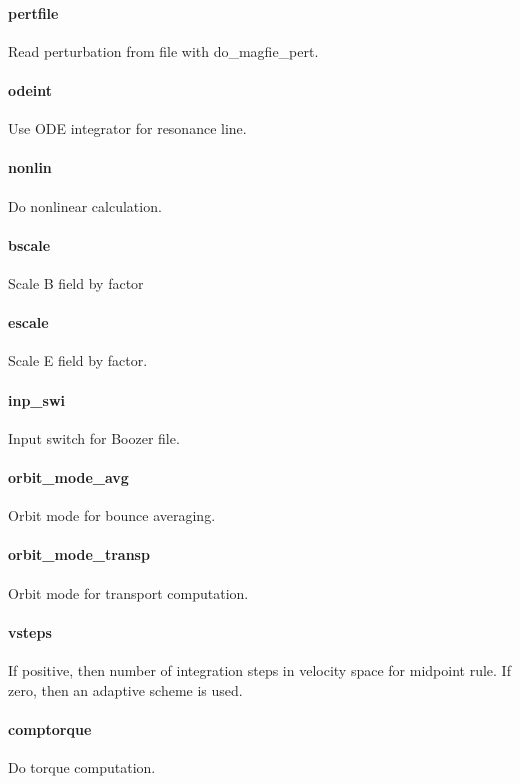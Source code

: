 \paragraph{pertfile}
Read perturbation from file with do\_magfie\_pert.

\paragraph{odeint}
Use ODE integrator for resonance line.

\paragraph{nonlin}
Do nonlinear calculation.

\paragraph{bscale}
Scale B field by factor

\paragraph{escale}
Scale E field by factor.

\paragraph{inp\_swi}
Input switch for Boozer file.

\paragraph{orbit\_mode\_avg}
Orbit mode for bounce averaging.

\paragraph{orbit\_mode\_transp}
Orbit mode for transport computation.

\paragraph{vsteps}
If positive, then number of integration steps in velocity space for
midpoint rule. If zero, then an adaptive scheme is used.

\paragraph{comptorque}
Do torque computation.

